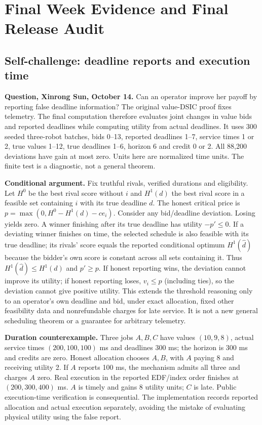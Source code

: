 \clearpage\onecolumn
\section{Final Week Evidence and Final Release Audit}
\subsection{Self-challenge: deadline reports and execution time}
\textbf{Question, Xinrong Sun, October 14.} Can an operator improve her payoff by reporting false deadline information? The original value-DSIC proof fixes telemetry. The final computation therefore evaluates joint changes in value bids and reported deadlines while computing utility from actual deadlines. It uses 300 seeded three-robot batches, bids 0--13, reported deadlines 1--7, service times 1 or 2, true values 1--12, true deadlines 1--6, horizon 6 and credit 0 or 2. All 88,200 deviations have gain at most zero. Units here are normalized time units. The finite test is a diagnostic, not a general theorem.

\textbf{Conditional argument.} Fix truthful rivals, verified durations and eligibility. Let $H^0$ be the best rival score without $i$ and $H^1(d)$ the best rival score in a feasible set containing $i$ with its true deadline $d$. The honest critical price is $p=\max(0,H^0-H^1(d)-ce_i)$. Consider any bid/deadline deviation. Losing yields zero. A winner finishing after its true deadline has utility $-p'\leq0$. If a deviating winner finishes on time, the selected schedule is also feasible with its true deadline; its rivals' score equals the reported conditional optimum $H^1(\hat d)$ because the bidder's own score is constant across all sets containing it. Thus $H^1(\hat d)\leq H^1(d)$ and $p'\geq p$. If honest reporting wins, the deviation cannot improve its utility; if honest reporting loses, $v_i\leq p$ (including ties), so the deviation cannot give positive utility. This extends the threshold reasoning only to an operator's own deadline and bid, under exact allocation, fixed other feasibility data and nonrefundable charges for late service. It is not a new general scheduling theorem or a guarantee for arbitrary telemetry.

\textbf{Duration counterexample.} Three jobs $A,B,C$ have values $(10,9,8)$, actual service times $(200,100,100)$ ms and deadlines 300 ms; the horizon is 300 ms and credits are zero. Honest allocation chooses $A,B$, with $A$ paying 8 and receiving utility 2. If $A$ reports 100 ms, the mechanism admits all three and charges $A$ zero. Real execution in the reported EDF/index order finishes at $(200,300,400)$ ms. $A$ is timely and gains 8 utility units; $C$ is late. Public execution-time verification is consequential. The implementation records reported allocation and actual execution separately, avoiding the mistake of evaluating physical utility using the false report.

